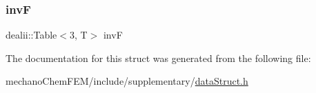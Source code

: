 \mbox{\label{structdeformation_mapwith_grad_ae40deb9e4616ec6d0b77519e56646ce0}} 
\subsubsection{\texorpdfstring{invF}{invF}}
{\footnotesize\ttfamily dealii\+::\+Table$<$3, T$>$ invF}



The documentation for this struct was generated from the following file\+:\begin{DoxyCompactItemize}
\item 
mechano\+Chem\+F\+E\+M/include/supplementary/\mbox{\hyperlink{data_struct_8h}{data\+Struct.\+h}}\end{DoxyCompactItemize}
